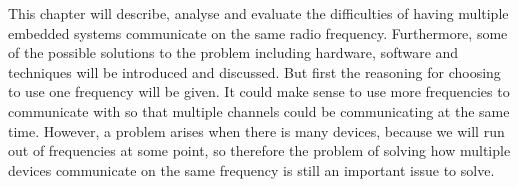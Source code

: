 This chapter will describe, analyse and evaluate the difficulties of having multiple embedded systems communicate on the same radio frequency.
Furthermore, some of the possible solutions to the problem including hardware, software and techniques will be introduced and discussed.
But first the reasoning for choosing to use one frequency will be given. 
It could make sense to use more frequencies to communicate with so that multiple channels could be communicating at the same time.
However, a problem arises when there is many devices, because we will run out of frequencies at some point, so therefore the problem of solving how multiple devices communicate on the same frequency is still an important issue to solve. 

